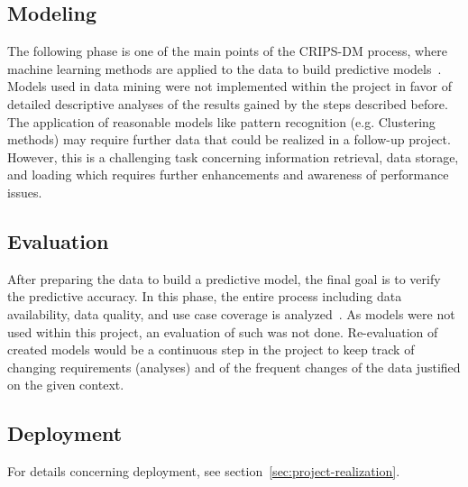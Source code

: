\subsection{Modeling}\label{subsec:modeling}
The following phase is one of the main points of the CRIPS-DM process, where machine learning methods are applied to the data to build predictive models~\autocite[cf.][]{Semmelmann.2020}.
Models used in data mining were not implemented within the project in favor of detailed descriptive analyses of the results gained by the steps described before.
The application of reasonable models like pattern recognition (e.g. Clustering methods) may require further data that could be realized in a follow-up project.
However, this is a challenging task concerning information retrieval, data storage, and loading which requires further enhancements and awareness of performance issues.

\subsection{Evaluation}\label{subsec:evaluation}
After preparing the data to build a predictive model, the final goal is to verify the predictive accuracy.
In this phase, the entire process including data availability, data quality, and use case coverage is analyzed~\autocite[cf.][]{Semmelmann.2020}.
As models were not used within this project, an evaluation of such was not done.
Re-evaluation of created models would be a continuous step in the project to keep track of changing requirements (analyses) and of the frequent changes of the data justified on the given context.

\subsection{Deployment}\label{subsec:deployment}
For details concerning deployment, see section~\ref{sec:project-realization}.